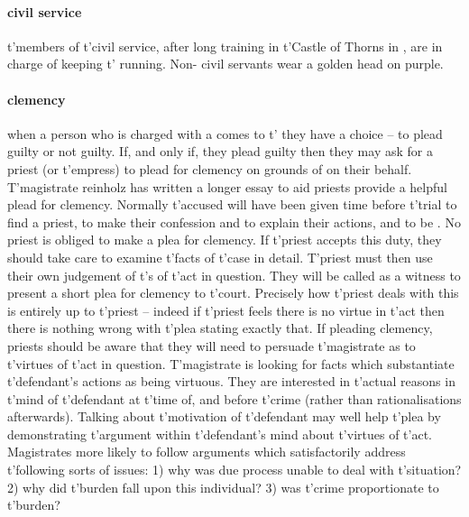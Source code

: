 \paragraph{civil service} t'\allowbreak members of t'\allowbreak civil service, after long training in t'\allowbreak Castle of Thorns in , are in charge of keeping t'\allowbreak {} running. Non- civil servants wear a golden  head on purple.
\paragraph{clemency} when a person who is charged with a  comes to t'\allowbreak {} they have a choice – to plead guilty or not guilty. If, and only if, they plead guilty then they may ask for a priest (or t'\allowbreak empress) to plead for clemency on grounds of  on their behalf. T'magistrate reinholz has written a longer essay to aid priests provide a helpful plead for clemency. Normally t'\allowbreak accused will have been given time before t'\allowbreak trial to find a priest, to make their confession and to explain their actions, and to be . No priest is obliged to make a plea for clemency. If t'\allowbreak priest accepts this duty, they should take care to examine t'\allowbreak facts of t'\allowbreak case in detail. T'priest must then use their own judgement of t'\allowbreak {}s of t'\allowbreak act in question. They will be called as a witness to present a short plea for clemency to t'\allowbreak court. Precisely how t'\allowbreak priest deals with this is entirely up to t'\allowbreak priest – indeed if t'\allowbreak priest feels there is no virtue in t'\allowbreak act then there is nothing wrong with t'\allowbreak plea stating exactly that. If pleading clemency, priests should be aware that they will need to persuade t'\allowbreak magistrate as to t'\allowbreak virtues of t'\allowbreak act in question. T'magistrate is looking for facts which substantiate t'\allowbreak defendant's actions as being virtuous. They are interested in t'\allowbreak actual reasons in t'\allowbreak mind of t'\allowbreak defendant at t'\allowbreak time of, and before t'\allowbreak crime (rather than rationalisations afterwards). Talking about t'\allowbreak motivation of t'\allowbreak defendant may well help t'\allowbreak plea by demonstrating t'\allowbreak argument within t'\allowbreak defendant's mind about t'\allowbreak virtues of t'\allowbreak act. Magistrates more likely to follow arguments which satisfactorily address t'\allowbreak following sorts of issues: 1) why was due process unable to deal with t'\allowbreak situation? 2) why did t'\allowbreak burden fall upon this individual? 3) was t'\allowbreak crime proportionate to t'\allowbreak burden? 
